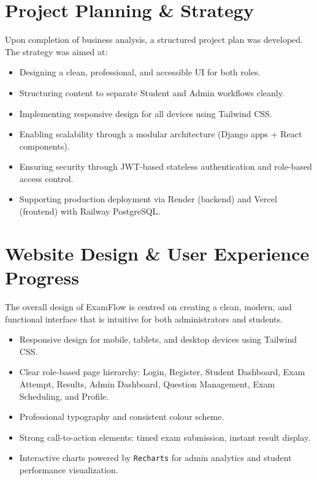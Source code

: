 \documentclass[12pt,a4paper]{article}
\begin{document}
\section{Project Planning \& Strategy}

Upon completion of business analysis, a structured project plan was developed. The strategy was aimed at:

\begin{itemize}[leftmargin=1.5em]
  \item Designing a clean, professional, and accessible UI for both roles.
  \item Structuring content to separate Student and Admin workflows cleanly.
  \item Implementing responsive design for all devices using Tailwind CSS.
  \item Enabling scalability through a modular architecture (Django apps + React components).
  \item Ensuring security through JWT-based stateless authentication and role-based access control.
  \item Supporting production deployment via Render (backend) and Vercel (frontend) with Railway PostgreSQL.
\end{itemize}

\section{Website Design \& User Experience Progress}

The overall design of ExamFlow is centred on creating a clean, modern, and functional interface that is intuitive for both administrators and students.

\begin{itemize}[leftmargin=1.5em]
  \item Responsive design for mobile, tablets, and desktop devices using Tailwind CSS.
  \item Clear role-based page hierarchy: Login, Register, Student Dashboard, Exam Attempt, Results, Admin Dashboard, Question Management, Exam Scheduling, and Profile.
  \item Professional typography and consistent colour scheme.
  \item Strong call-to-action elements: timed exam submission, instant result display.
  \item Interactive charts powered by \texttt{Recharts} for admin analytics and student performance visualization.
\end{itemize}
\end{document}
